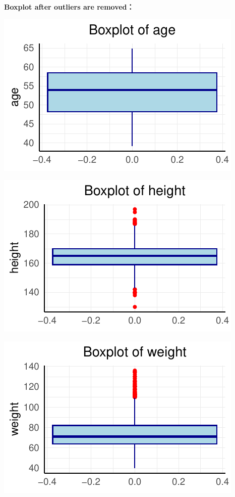 \documentclass[
  letterpaper,
  DIV=11,
  numbers=noendperiod]{scrartcl}
\begin{document}
\textbf{Boxplot after outliers are removed：}

\begin{center}
\includegraphics{home_work_test_files/figure-pdf/unnamed-chunk-6-1.pdf}
\end{center}

\begin{center}
\includegraphics{home_work_test_files/figure-pdf/unnamed-chunk-6-2.pdf}
\end{center}

\begin{center}
\includegraphics{home_work_test_files/figure-pdf/unnamed-chunk-6-3.pdf}
\end{center}
\end{document}
